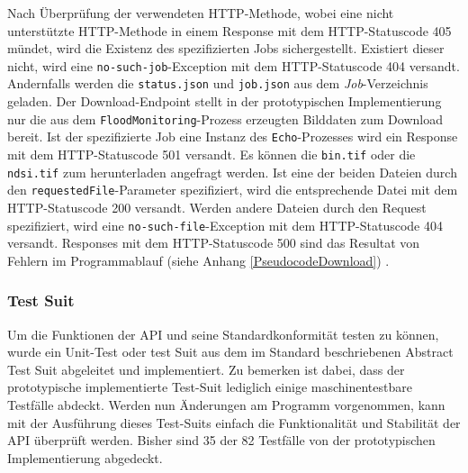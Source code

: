Nach Überprüfung der verwendeten HTTP-Methode, wobei eine nicht unterstützte HTTP-Methode in einem Response mit dem HTTP-Statuscode 405 mündet, wird die Existenz des 
spezifizierten Jobs sichergestellt. Existiert dieser nicht, wird eine \verb|no-such-job|-Exception mit dem HTTP-Statuscode 404 versandt.  
Andernfalls werden die \verb|status.json| und \verb|job.json| aus dem \emph{Job}-Verzeichnis geladen. Der Download-Endpoint stellt in der prototypischen 
Implementierung nur die aus dem \verb|FloodMonitoring|-Prozess erzeugten Bilddaten zum Download bereit. Ist der spezifizierte Job eine Instanz des \verb|Echo|-Prozesses 
wird ein Response mit dem HTTP-Statuscode 501 versandt. Es können die \verb|bin.tif| oder die \verb|ndsi.tif| zum herunterladen angefragt werden. Ist eine der beiden Dateien 
durch den \verb|requestedFile|-Parameter spezifiziert, wird die entsprechende Datei mit dem HTTP-Statuscode 200 versandt. Werden andere Dateien durch den Request 
spezifiziert, wird eine \verb|no-such-file|-Exception mit dem HTTP-Statuscode 404 versandt. Responses mit dem HTTP-Statuscode 500 sind das Resultat von Fehlern im 
Programmablauf (siehe Anhang \ref{PseudocodeDownload}) \cite{code}. 

\subsubsection{Test Suit}
Um die Funktionen der API und seine Standardkonformität testen zu können, wurde ein Unit-Test oder test Suit aus dem im Standard beschriebenen Abstract Test Suit abgeleitet und 
implementiert. Zu bemerken ist dabei, dass der prototypische implementierte Test-Suit lediglich einige maschinentestbare Testfälle abdeckt. 
Werden nun Änderungen am Programm vorgenommen, kann mit der Ausführung dieses Test-Suits einfach die Funktionalität und Stabilität der API überprüft werden. 
Bisher sind 35 der 82 Testfälle von der prototypischen Implementierung abgedeckt.

